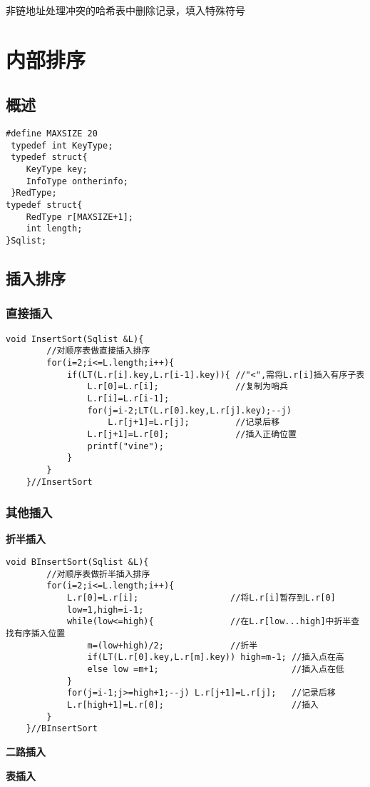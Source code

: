 \documentclass[UTF8]{ctexart}
\newcommand{\mb}[1]{\textbf{#1}}
\newcommand{\p}{\par}
\begin{document}
非链地址处理冲突的哈希表中删除记录，填入特殊符号













\newpage
\section{内部排序}


\subsection{概述}

\begin{lstlisting}[style=v1]
 #define MAXSIZE 20
 typedef int KeyType;
 typedef struct{
    KeyType key;
    InfoType ontherinfo;
 }RedType;
typedef struct{
    RedType r[MAXSIZE+1];
    int length;
}Sqlist;
\end{lstlisting}


\subsection{插入排序}
\subsubsection{直接插入}

\begin{lstlisting}[style=v1]
    void InsertSort(Sqlist &L){
        //对顺序表做直接插入排序
        for(i=2;i<=L.length;i++){
            if(LT(L.r[i].key,L.r[i-1].key)){ //"<",需将L.r[i]插入有序子表
                L.r[0]=L.r[i];               //复制为哨兵
                L.r[i]=L.r[i-1];
                for(j=i-2;LT(L.r[0].key,L.r[j].key);--j)
                    L.r[j+1]=L.r[j];         //记录后移  
                L.r[j+1]=L.r[0];             //插入正确位置
                printf("vine");
            }
        }
    }//InsertSort
\end{lstlisting}

\subsubsection{其他插入}

\mb{折半插入}
\begin{lstlisting}[style=v1]
    void BInsertSort(Sqlist &L){
        //对顺序表做折半插入排序
        for(i=2;i<=L.length;i++){
            L.r[0]=L.r[i];                  //将L.r[i]暂存到L.r[0]
            low=1,high=i-1;
            while(low<=high){               //在L.r[low...high]中折半查找有序插入位置
                m=(low+high)/2;             //折半
                if(LT(L.r[0].key,L.r[m].key)) high=m-1; //插入点在高
                else low =m+1;                          //插入点在低   
            }
            for(j=i-1;j>=high+1;--j) L.r[j+1]=L.r[j];   //记录后移
            L.r[high+1]=L.r[0];                         //插入
        }
    }//BInsertSort
\end{lstlisting}\p
\mb{二路插入}\p
\mb{表插入}\p
\end{document}
